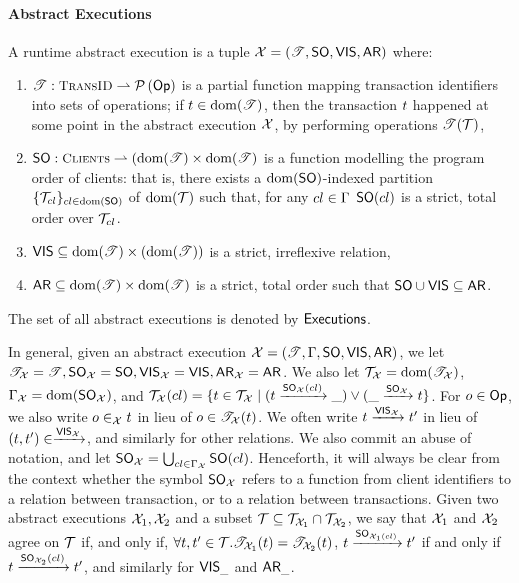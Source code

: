\paragraph{Abstract Executions}

\begin{definition}
A runtime abstract execution is a tuple $\mathcal{X} = (\mathscr{T}, {\sf{SO}}, {\mathsf{VIS}}, {\sf{AR}})$ where: 
\begin{enumerate}
\item $\TtoOp{T} : \TransID \rightharpoonup \powerset{\Op}$ is a partial function mapping transaction 
identifiers into sets of operations; if $t \in \operatorname{dom}(\mathscr{T})$, then the transaction $t$ happened 
at some point in the abstract execution ${\mathcal{X}}$, by performing operations $\mathscr{T}(\mathcal{T})$, 
\item $\PO: \tidset \rightharpoonup (\dom(\TtoOp{T}) \times \dom(\TtoOp{T})$ is a function modelling the 
program order of clients: that is, there exists a $\operatorname{dom}({\sf{SO}})$-indexed partition $\{\mathcal{T}_{cl}\}_{cl \in \operatorname{dom}({\sf{SO}})}$ of 
$\operatorname{dom}(\mathscr{\mathcal{T}})$ such that, for any $cl \in \Gamma$ ${\sf{SO}}(cl)$ is a strict, total order over $\mathcal{T}_{cl}$.
\item ${\mathsf{VIS}} \subseteq \operatorname{dom}(\mathscr{T}) \times (\operatorname{dom}(\mathscr{T}))$ is a strict, irreflexive relation, 
\item ${\sf{AR}} \subseteq \operatorname{dom}(\mathscr{T}) \times \operatorname{dom}(\mathscr{T})$ is a strict, total order such that ${\sf{SO}} \cup {\mathsf{VIS}} \subseteq {\sf{AR}}$.
\end{enumerate}

The set of all abstract executions is denoted by ${\mathsf{Executions}}$.
\end{definition}
In general, given an abstract execution ${\mathcal{X}} = (\mathscr{T}, \Gamma, {\sf{SO}}, {\mathsf{VIS}}, {\sf{AR}})$, we let ${\mathscr{T}}_{\mathcal{X}} = \mathscr{T}, 
 {\sf{SO}}_{\mathcal{X}} = {\sf{SO}}, {{\mathsf{VIS}}}_{\mathcal{X}} = {\mathsf{VIS}}, {\sf{AR}}_{\mathcal{X}} = {\sf{AR}}$. We also let $\mathcal{T}_{\mathcal{X}} = \operatorname{dom}(\mathscr{T}_{\mathcal{X}})$, 
 $\Gamma_{\mathcal{X}} = \operatorname{dom}({\sf{SO}}_{\mathcal{X}})$, and $\mathcal{T}_{\mathcal{X}}(cl) = \{t \in \mathcal{T}_{\mathcal{X}} \mid (t \xrightarrow{{\sf{SO}}_{\mathcal{X}}(cl)} \_) 
 \vee (\_ \xrightarrow{{\sf{SO}}_{\mathcal{X}}} t \}$. For $o \in \mathsf{Op}$, we also write $o \in_{{\mathcal{X}}} t$ in lieu of $o \in \mathscr{T}_{\mathcal{X}}(t)$.
We often write $t \xrightarrow{{\mathsf{VIS}}_{{\mathcal{X}}}} t'$ in lieu of $(t, t') \in \xrightarrow{{\mathsf{VIS}}_{{\mathcal{X}}}}$, 
and similarly for other relations. We also commit an abuse of notation, and let ${\sf{SO}}_{{\mathcal{X}}} = 
\bigcup_{cl \in \Gamma_{\mathcal{X}}} {\sf{SO}}(cl)$. Henceforth, it will always be clear from the context 
whether the symbol ${\sf{SO}}_{\mathcal{X}}$ refers to a function from client identifiers to a relation between transaction, or to a relation
between transactions. 
Given two abstract executions $\mathcal{X}_1, \mathcal{X}_2$ and a subset $\mathcal{T} \subseteq \mathcal{T}_{\mathcal{X}_1} \cap \mathcal{T}_{\mathcal{X}_2}$, 
we say that $\mathcal{X}_1$ and $\mathcal{X}_2$ agree on $\mathcal{T}$ if, and only if, $\forall t,t' \in \mathcal{T}. \mathscr{T}_{\mathcal{X}_1}(t) = 
\mathscr{T}_{\mathcal{X}_2}(t)$, $t \xrightarrow{{\sf{SO}}_{\mathcal{X}_1(cl)}} t'$ if and only if $t \xrightarrow{{\sf{SO}}_{\mathcal{X}_2}(cl)} 
t'$, and similarly for ${\mathsf{VIS}}_{\_}$ and ${\sf{AR}}_{\_}$.


